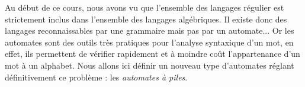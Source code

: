 



Au début de ce cours, nous avons vu que l'ensemble des langages régulier est strictement inclus 
dans l'ensemble des langages algébriques. Il existe donc des langages reconnaissables par une grammaire 
mais pas par un automate... 
Or les automates sont des outils très pratiques pour l'analyse syntaxique d'un mot, en effet, ils permettent 
de vérifier rapidement et à moindre coût l'appartenance d'un mot à un alphabet. 
Nous allons ici définir un nouveau type d'automates réglant définitivement ce problème : les \emph{automates à piles}. 

